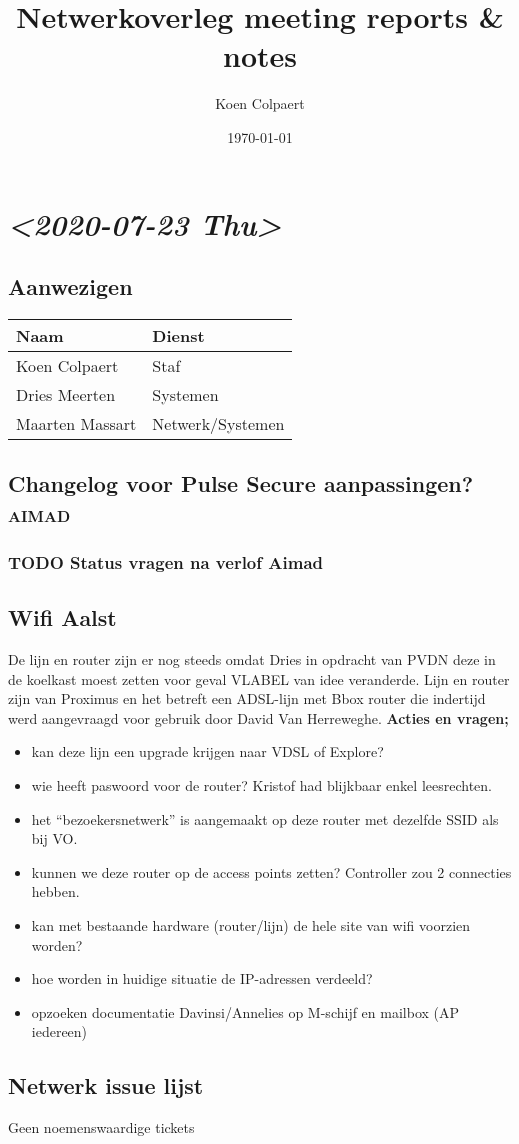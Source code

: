 \documentclass[11pt]{article}
\author{Koen Colpaert}
\date{\today}
\title{Netwerkoverleg meeting reports \& notes}
\begin{document}
\maketitle

\section{\textit{<2020-07-23 Thu>}}
\label{sec:org3be918c}
\subsection{Aanwezigen}
\label{sec:org80d97dd}
\begin{center}
\begin{tabular}{ll}
Naam & Dienst\\
\hline
Koen Colpaert & Staf\\
Dries Meerten & Systemen\\
Maarten Massart & Netwerk/Systemen\\
\end{tabular}
\end{center}

\subsection{Changelog voor Pulse Secure aanpassingen?\hfill{}\textsc{aimad}}
\label{sec:org62efc99}
\subsubsection{{\bfseries\sffamily TODO} Status vragen na verlof Aimad}
\label{sec:org91b22f7}
\subsection{Wifi Aalst}
\label{sec:orga462517}
De lijn en router zijn er nog steeds omdat Dries in opdracht van PVDN deze in de koelkast moest zetten voor geval VLABEL van idee veranderde. Lijn en router zijn van Proximus en het betreft een ADSL-lijn met Bbox router die indertijd werd aangevraagd voor gebruik door David Van Herreweghe.
\textbf{Acties en vragen;}
\begin{itemize}
\item kan deze lijn een upgrade krijgen naar VDSL of Explore?
\item wie heeft paswoord voor de router? Kristof had blijkbaar enkel leesrechten.
\item het ``bezoekersnetwerk'' is aangemaakt op deze router met dezelfde SSID als bij VO.
\item kunnen we deze router op de access points zetten? Controller zou 2 connecties hebben.
\item kan met bestaande hardware (router/lijn) de hele site van wifi voorzien worden?
\item hoe worden in huidige situatie de IP-adressen verdeeld?
\item opzoeken documentatie Davinsi/Annelies op M-schijf en mailbox (AP iedereen)
\end{itemize}
\subsection{Netwerk issue lijst}
\label{sec:org64a75f9}
Geen noemenswaardige tickets
\end{document}
